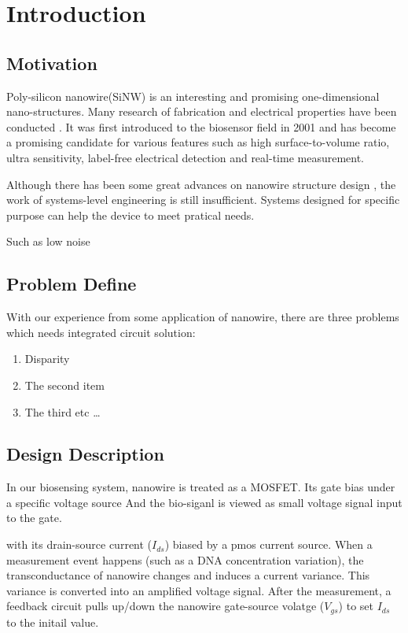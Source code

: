 \chapter{Introduction}
\section{Motivation}
Poly-silicon nanowire(SiNW) is an interesting and promising one-dimensional nano-structures. Many research of fabrication and electrical properties have been conducted \cite{J1}. It was first introduced to the biosensor field in 2001\cite{J2} and has become a promising candidate for various features such as high surface-to-volume ratio, ultra sensitivity, label-free electrical detection and  real-time measurement.

Although there has been some great advances on nanowire structure design \cite{J3}, the work of systems-level engineering is still insufficient.
Systems designed for specific purpose can help the device to meet pratical needs.


{\color{red}Such as low noise }

\section*{Problem Define}
With our experience from some application of nanowire, there are {\color{red}three} problems which needs {\color{red} integrated circuit solution:}
\begin{enumerate}
\item Disparity
\item The second item
\item The third etc \ldots
\end{enumerate}




\section{Design Description}
In our biosensing system, nanowire is treated as a MOSFET.
Its gate bias under a specific voltage source
And the bio-siganl is viewed as small voltage signal input to the gate.


 with its drain-source current ($I_{ds}$)  biased by a pmos current source.
When a measurement event happens (such as a DNA concentration variation), the transconductance of nanowire changes and induces a current variance.
This variance is converted into an amplified voltage signal.
After the measurement, a feedback circuit pulls up/down the nanowire gate-source volatge ($V_{gs}$) to set $I_{ds}$ to the initail value.




